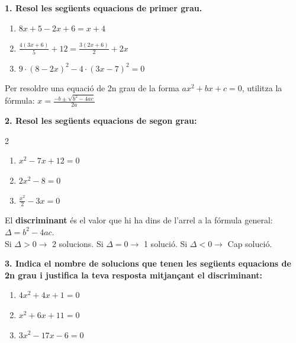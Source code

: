 \documentclass[12pt,a4paper]{article}
\begin{document}
\textbf{1. Resol les següents equacions de primer grau.}
\begin{enumerate}[label=\alph*)]
    \item $8x + 5 - 2x + 6 = x + 4$ \vspace{1.5cm}
    \item $\frac{4(3x+6)}{5} + 12 = \frac{3(2x+6)}{2} + 2x$ \vspace{2cm}
    \item $9 \cdot (8 - 2x)^2 - 4 \cdot (3x - 7)^2 = 0$ \vspace{2cm}
\end{enumerate}

\begin{capsula}
Per resoldre una equació de 2n grau de la forma $ax^2 + bx + c = 0$, utilitza la fórmula:
$x = \frac{-b \pm \sqrt{b^2 - 4ac}}{2a}$
\end{capsula}

\textbf{2. Resol les següents equacions de segon grau:}
\begin{multicols}{2}
\begin{enumerate}[label=\alph*)]
    \item $x^2 - 7x + 12 = 0$ \vspace{2cm}
    \item $2x^2 - 8 = 0$ \vspace{2cm}
    \item $\frac{x^2}{2} - 3x = 0$ \vspace{2cm}
\end{enumerate}
\end{multicols}

\vspace{1cm}

\begin{capsula}
El \textbf{discriminant} és el valor que hi ha dins de l'arrel a la fórmula general: $\Delta = b^2 - 4ac$. \\
Si $\Delta > 0 \rightarrow$ 2 solucions. Si $\Delta = 0 \rightarrow$ 1 solució. Si $\Delta < 0 \rightarrow$ Cap solució.
\end{capsula}

\textbf{3. Indica el nombre de solucions que tenen les següents equacions de 2n grau i justifica la teva resposta mitjançant el discriminant:}
\begin{enumerate}[label=\alph*)]
    \item $4x^2 + 4x + 1 = 0$ \vspace{1.5cm}
    \item $x^2 + 6x + 11 = 0$ \vspace{1.5cm}
    \item $3x^2 - 17x - 6 = 0$ \vspace{1.5cm}
\end{enumerate}
\end{document}
